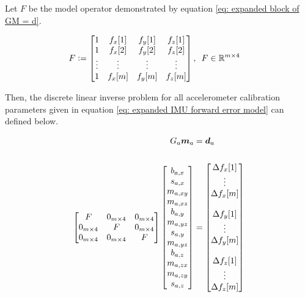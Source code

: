 Let $F$ be the model operator demonstrated by equation \ref{eq: expanded block of GM = d}.

\begin{align} \label{eq: F}
	F &\vcentcolon= \begin{bmatrix} 
		1 & f_x[1] & f_y[1] & f_z[1] \\ 1 & f_x[2] & f_y[2] & f_z[2] \\ \vdots & \vdots & \vdots & \vdots \\ 1 & f_x[m] & f_y[m] & f_z[m]
	\end{bmatrix},\,\,\, F \in \mathbb{R}^{m \times 4}
\end{align}

Then, the discrete linear inverse problem for all accelerometer calibration parameters given in equation \ref{eq: expanded IMU forward error model} can defined below.

\begin{align} \label{eq: Gm = d for all accel parameters}
	G_a \boldsymbol{m}_a &= \boldsymbol{d}_a \notag\\
	\\
	\begin{bmatrix} 
		F & 0_{m \times 4} & 0_{m \times 4} \\
		0_{m \times 4} & F & 0_{m \times 4} \\
		0_{m \times 4} & 0_{m \times 4} & F \\
	\end{bmatrix} \begin{bmatrix}
		b_{a,x} \\ s_{a,x} \\ m_{a,xy} \\ m_{a,xz} \\ b_{a,y} \\ m_{a,yz} \\ s_{a,y} \\ m_{a,yz} \\ b_{a,z} \\ m_{a,zx} \\ m_{a,zy} \\ s_{a,z}
	\end{bmatrix} &= \begin{bmatrix}
		\Delta f_x[1] \\ \vdots \\ \Delta f_x[m] \\ \\ \Delta f_y[1] \\ \vdots \\ \Delta f_y[m] \\ \\ \Delta f_z[1] \\ \vdots \\ \Delta f_z[m]
	\end{bmatrix} \notag
\end{align}

